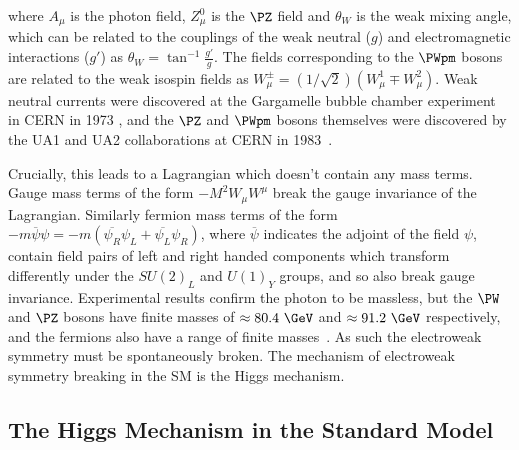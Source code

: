 where $A_{\mu}$ is the photon field, $Z_{\mu}^{0}$ is the $\PZ$ field
and $\theta_{W}$ is the weak mixing angle,
which can be related to the couplings of the weak neutral ($g$) and electromagnetic
interactions ($g'$) as $\theta_{W}=\tan^{-1}{\frac{g'}{g}}$. The fields
corresponding to the $\PWpm$ bosons are related to the weak isospin fields as
$W_{\mu}^{\pm} = (1/\sqrt{2})(W_{\mu}^{1} \mp W_{\mu}^{2})$. Weak neutral
currents were discovered at the Gargamelle bubble chamber experiment in CERN in
1973 \cite{Hasert:1973ff}, and the $\PZ$ and $\PWpm$ bosons themselves were
discovered by the UA1 and UA2 collaborations at CERN in
1983~\cite{Arnison:1983rp,Banner:1983jy,Arnison:1983mk,Bagnaia:1983zx}.

Crucially, this leads to a Lagrangian which doesn't contain any mass terms.
Gauge mass terms of the form $-M^{2}W_{\mu}W^{\mu}$ break the gauge invariance
of the Lagrangian. Similarly fermion mass terms of the form
$-m\overline{\psi}\psi = -m(\overline{\psi_{R}}\psi_{L} +
\overline{\psi_{L}}\psi_{R})$, where $\overline\psi$ indicates the adjoint of
the field $\psi$, contain field pairs of left and right handed components which transform differently
under the $SU(2)_{L}$ and $U(1)_{Y}$ groups, and so also break gauge invariance.
Experimental results confirm the photon to be massless, but the $\PW$ and $\PZ$
bosons have finite masses of $\approx80.4~\GeV$ and $\approx91.2~\GeV$
respectively, and the fermions also have a range of finite masses~\cite{PDG}. As
such the electroweak symmetry must be spontaneously broken. The mechanism of
electroweak symmetry breaking in the \ac{SM} is the Higgs mechanism.

\subsection{The Higgs Mechanism in the Standard Model}
\label{sec:SMHiggs}


